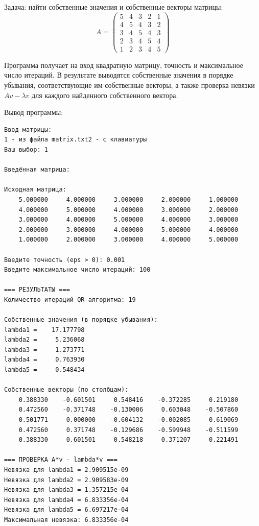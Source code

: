 \documentclass[calculation_methods, och]{SCWorks1}
\begin{document}
Задача: найти собственные значения и собственные векторы матрицы:
\[
A = \begin{pmatrix}
    5 & 4 & 3 & 2 & 1 \\
    4 & 5 & 4 & 3 & 2 \\
    3 & 4 & 5 & 4 & 3 \\
    2 & 3 & 4 & 5 & 4 \\
    1 & 2 & 3 & 4 & 5
\end{pmatrix}
\]

Программа получает на вход квадратную матрицу, точность и максимальное число итераций. В результате выводятся собственные значения в порядке убывания, соответствующие им собственные векторы, а также проверка невязки $A v - \lambda v$ для каждого найденного собственного вектора.

Вывод программы:
\begin{Verbatim}[formatcom=\fontsize{12}{12}\selectfont]
    Ввод матрицы:
1 - из файла matrix.txt2 - с клавиатуры
Ваш выбор: 1

Введённая матрица:

Исходная матрица:
    5.000000     4.000000     3.000000     2.000000     1.000000 
    4.000000     5.000000     4.000000     3.000000     2.000000 
    3.000000     4.000000     5.000000     4.000000     3.000000 
    2.000000     3.000000     4.000000     5.000000     4.000000 
    1.000000     2.000000     3.000000     4.000000     5.000000 

Введите точность (eps > 0): 0.001
Введите максимальное число итераций: 100

=== РЕЗУЛЬТАТЫ ===
Количество итераций QR-алгоритма: 19

Собственные значения (в порядке убывания):
lambda1 =    17.177798
lambda2 =     5.236068
lambda3 =     1.273771
lambda4 =     0.763930
lambda5 =     0.548434

Собственные векторы (по столбцам):
    0.388330    -0.601501     0.548416    -0.372285     0.219180 
    0.472560    -0.371748    -0.130006     0.603048    -0.507860 
    0.501771     0.000000    -0.604132    -0.002085     0.619069 
    0.472560     0.371748    -0.129686    -0.599948    -0.511599 
    0.388330     0.601501     0.548218     0.371207     0.221491 

=== ПРОВЕРКА A*v - lambda*v ===
Невязка для lambda1 = 2.909515e-09
Невязка для lambda2 = 2.909583e-09
Невязка для lambda3 = 1.357215e-04
Невязка для lambda4 = 6.833356e-04
Невязка для lambda5 = 6.697217e-04
Максимальная невязка: 6.833356e-04
\end{Verbatim}
\end{document}
